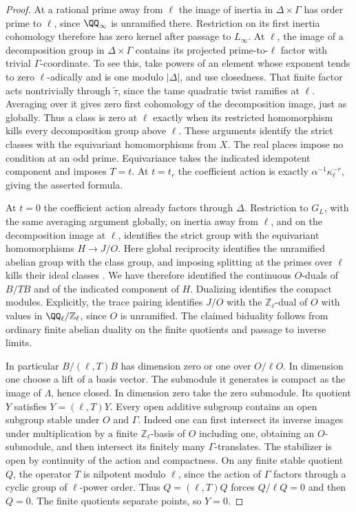 \documentclass[a4paper,11pt]{article}
\theoremstyle{definition}
\theoremstyle{remark}
\newcommand{\ZZ}{\mathbb Z}\newcommand{\ord}{\operatorname{ord}}
\numberwithin{equation}{section}
\begin{document}
\begin{proof}
At a rational prime away from \(\ell\) the image of inertia in
\(\Delta\times\Gamma\) has order prime to \(\ell\), since
\(\QQ_\infty\) is unramified there. Restriction on its first
inertia cohomology therefore has zero kernel after passage to
\(L_\infty\). At \(\ell\), the image of a decomposition group
in \(\Delta\times\Gamma\) contains its projected prime-to-\(\ell\)
factor with trivial \(\Gamma\)-coordinate. To see this, take
powers of an element whose exponent tends to zero
\(\ell\)-adically and is one modulo \(|\Delta|\), and use
closedness. That finite factor acts nontrivially through
\(\widetilde\tau\), since the tame quadratic twist ramifies at
\(\ell\). Averaging over it gives zero first cohomology of the
decomposition image, just as globally. Thus a class is zero at
\(\ell\) exactly when its restricted homomorphism kills every
decomposition group above \(\ell\). These arguments identify
the strict classes with the equivariant homomorphisms from
\(X\). The real places impose no condition at an odd prime.
Equivariance takes the indicated idempotent component and imposes
\(T=t\). At \(t=t_r\) the coefficient action is exactly
\(\alpha^{-1}\kappa_\ell^{-r}\), giving the asserted formula.

At \(t=0\) the coefficient action already factors through
\(\Delta\). Restriction to \(G_L\), with the same averaging
argument globally, on inertia away from \(\ell\), and on the
decomposition image at \(\ell\), identifies the strict group
with the equivariant homomorphisms \(H\to J/O\). Here global
reciprocity identifies the unramified abelian group with the
class group, and imposing splitting at the primes over \(\ell\)
kills their ideal classes \cite{XI-VIII-rayclass444}. We have therefore
identified the continuous \(O\)-duals of \(B/TB\) and of the
indicated component of \(H\). Dualizing identifies the compact
modules. Explicitly, the trace pairing identifies \(J/O\) with
the \(\ZZ_\ell\)-dual of \(O\) with values in
\(\QQ_\ell/\ZZ_\ell\), since \(O\) is unramified. The claimed
biduality follows from ordinary finite abelian duality on the
finite quotients and passage to inverse limits.

In particular \(B/(\ell,T)B\) has dimension zero or one over
\(O/\ell O\). In dimension one choose a lift of a basis vector.
The submodule it generates is compact as the image of
\(\Lambda\), hence closed. In dimension zero take the zero
submodule. Its quotient \(Y\) satisfies \(Y=(\ell,T)Y\).
Every open additive subgroup contains an open subgroup stable
under \(O\) and \(\Gamma\). Indeed one can first intersect its
inverse images under multiplication by a finite \(\ZZ_\ell\)-basis
of \(O\) including one, obtaining an \(O\)-submodule, and then
intersect its finitely many \(\Gamma\)-translates. The stabilizer
is open by continuity of the action and compactness. On any
finite stable quotient \(Q\), the operator \(T\) is nilpotent
modulo \(\ell\), since the action of \(\Gamma\) factors through
a cyclic group of \(\ell\)-power order. Thus \(Q=(\ell,T)Q\)
forces \(Q/\ell Q=0\) and then \(Q=0\). The finite quotients
separate points, so \(Y=0\).
\end{proof}
\end{document}
